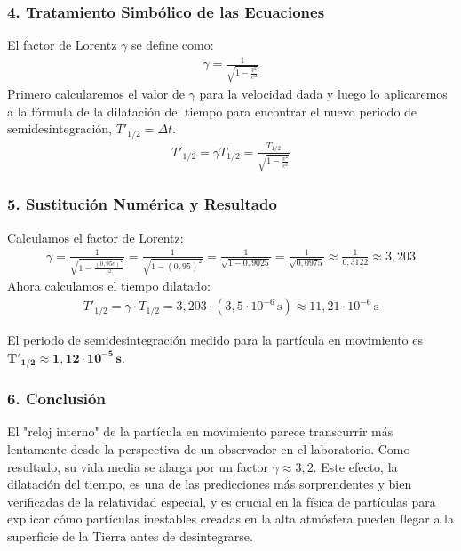 \subsubsection*{4. Tratamiento Simbólico de las Ecuaciones}
El factor de Lorentz $\gamma$ se define como:
\begin{gather}
    \gamma = \frac{1}{\sqrt{1 - \frac{v^2}{c^2}}}
\end{gather}
Primero calcularemos el valor de $\gamma$ para la velocidad dada y luego lo aplicaremos a la fórmula de la dilatación del tiempo para encontrar el nuevo periodo de semidesintegración, $T'_{1/2} = \Delta t$.
\begin{gather}
    T'_{1/2} = \gamma T_{1/2} = \frac{T_{1/2}}{\sqrt{1 - \frac{v^2}{c^2}}}
\end{gather}

\subsubsection*{5. Sustitución Numérica y Resultado}
Calculamos el factor de Lorentz:
\begin{gather}
    \gamma = \frac{1}{\sqrt{1 - \frac{(0,95c)^2}{c^2}}} = \frac{1}{\sqrt{1 - (0,95)^2}} = \frac{1}{\sqrt{1 - 0,9025}} = \frac{1}{\sqrt{0,0975}} \approx \frac{1}{0,3122} \approx 3,203
\end{gather}
Ahora calculamos el tiempo dilatado:
\begin{gather}
    T'_{1/2} = \gamma \cdot T_{1/2} = 3,203 \cdot (3,5 \cdot 10^{-6} \, \text{s}) \approx 11,21 \cdot 10^{-6} \, \text{s}
\end{gather}
\begin{cajaresultado}
El periodo de semidesintegración medido para la partícula en movimiento es $\boldsymbol{T'_{1/2} \approx 1,12 \cdot 10^{-5} \, s}$.
\end{cajaresultado}

\subsubsection*{6. Conclusión}
\begin{cajaconclusion}
El "reloj interno" de la partícula en movimiento parece transcurrir más lentamente desde la perspectiva de un observador en el laboratorio. Como resultado, su vida media se alarga por un factor $\gamma \approx 3,2$. Este efecto, la dilatación del tiempo, es una de las predicciones más sorprendentes y bien verificadas de la relatividad especial, y es crucial en la física de partículas para explicar cómo partículas inestables creadas en la alta atmósfera pueden llegar a la superficie de la Tierra antes de desintegrarse.
\end{cajaconclusion}

